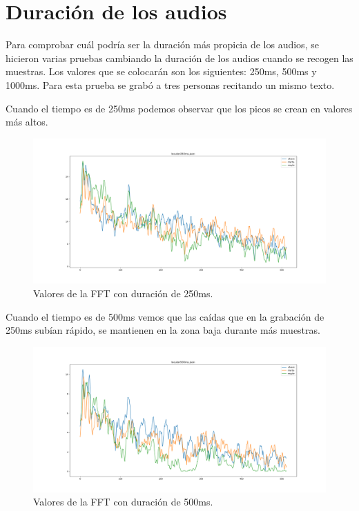 \documentclass[a4paper, 12pt]{book}
\begin{document}
\section{Duración de los audios}
\label{sec:duracion-audio}

Para comprobar cuál podría ser la duración más propicia de los audios, se hicieron varias pruebas cambiando la duración de los audios cuando se recogen las muestras. Los valores que se colocarán son los siguientes: 250ms, 500ms y 1000ms. Para esta prueba se grabó a tres personas recitando un mismo texto.

Cuando el tiempo es de 250ms podemos observar que los picos se crean en valores más altos.

\begin{figure}
	\centering
	\includegraphics[width=12cm, keepaspectratio]{img/locutor250ms.png}
	\caption{Valores de la FFT con duración de 250ms.}\label{fig:locutor250ms}
\end{figure}

Cuando el tiempo es de 500ms vemos que las caídas que en la grabación de 250ms subían rápido, se mantienen en la zona baja durante más muestras.

\begin{figure}
	\centering
	\includegraphics[width=12cm, keepaspectratio]{img/locutor500ms.png}
	\caption{Valores de la FFT con duración de 500ms.}\label{fig:locutor500ms}
\end{figure}
\end{document}
